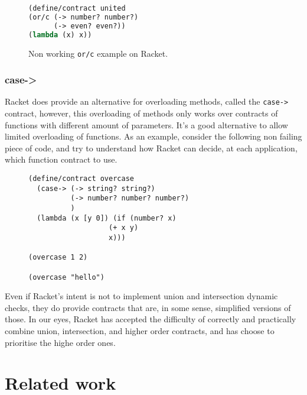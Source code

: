 \documentclass[sigplan,10pt,review,anonymous]{acmart}
\newcommand{\unsure}[2][1=]{}
\newcommand{\info}[2][1=]{}
\newcommand{\racket}[1]{\lstinline[language=racket]{#1}}
\begin{document}
\begin{figure}[h]

\begin{lstlisting}[language=lisp]
(define/contract united
(or/c (-> number? number?)
      (-> even? even?))
(lambda (x) x))
\end{lstlisting}
\caption{Non working \racket{or/c} example on Racket.}
\label{code:racket:or/c:non-working}

\end{figure}


\unsure{This section is overall a bit hard to follow. I
  think I've figured out what it means, but it needs more love. Also
  give an example which doesn't work and one that does for or/c.}

\subsubsection*{case->}

Racket does provide an alternative for overloading methods, called the
\racket{case->} contract, however, this overloading of methods only
works over contracts of functions with different amount of parameters.
It's a good alternative to allow limited overloading of functions.
As an example, consider the following non failing piece of code, and
try to understand how Racket can decide, at each application,
which function contract to use.

\begin{figure}[h]

\begin{lstlisting}[language=racket]
(define/contract overcase
  (case-> (-> string? string?)
          (-> number? number? number?)
          )
  (lambda (x [y 0]) (if (number? x)
                   (+ x y)
                   x)))

(overcase 1 2)

(overcase "hello")
\end{lstlisting}
\end{figure}

Even if Racket's intent is not to implement union and intersection
dynamic checks, they do provide contracts that are, in some sense,
simplified versions of those.
In our eyes, Racket has accepted the difficulty of correctly and practically
combine union, intersection, and higher order contracts, and has choose
to prioritise the highe order ones.

\newpage

\section{Related work}
\label{sec:related-work}
\info{Including a mention of statically typed systems with union}
\end{document}
